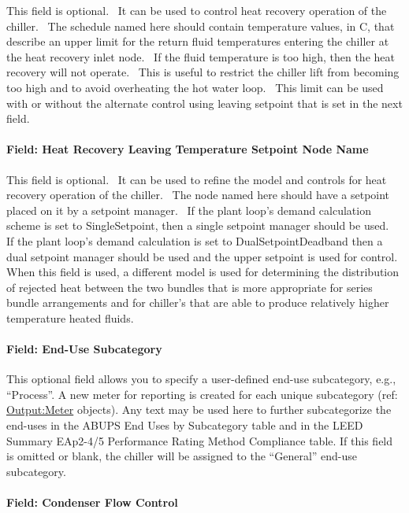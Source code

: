 This field is optional.~ It can be used to control heat recovery operation of the chiller.~ The schedule named here should contain temperature values, in C, that describe an upper limit for the return fluid temperatures entering the chiller at the heat recovery inlet node.~ If the fluid temperature is too high, then the heat recovery will not operate.~ This is useful to restrict the chiller lift from becoming too high and to avoid overheating the hot water loop.~ This limit can be used with or without the alternate control using leaving setpoint that is set in the next field.

\paragraph{Field: Heat Recovery Leaving Temperature Setpoint Node Name}\label{field-heat-recovery-leaving-temperature-setpoint-node-name-2}

This field is optional.~ It can be used to refine the model and controls for heat recovery operation of the chiller.~ The node named here should have a setpoint placed on it by a setpoint manager.~ If the plant loop's demand calculation scheme is set to SingleSetpoint, then a single setpoint manager should be used.~ If the plant loop's demand calculation is set to DualSetpointDeadband then a dual setpoint manager should be used and the upper setpoint is used for control.~ When this field is used, a different model is used for determining the distribution of rejected heat between the two bundles that is more appropriate for series bundle arrangements and for chiller's that are able to produce relatively higher temperature heated fluids.

\paragraph{Field: End-Use Subcategory}\label{end-use-subcategory-12}

This optional field allows you to specify a user-defined end-use subcategory, e.g., ``Process''. A new meter for reporting is created for each unique subcategory (ref: \hyperref[outputmeter-and-outputmetermeterfileonly]{Output:Meter} objects). Any text may be used here to further subcategorize the end-uses in the ABUPS End Uses by Subcategory table and in the LEED Summary EAp2-4/5 Performance Rating Method Compliance table. If this field is omitted or blank, the chiller will be assigned to the ``General'' end-use subcategory.

\paragraph{Field: Condenser Flow Control}\label{field-condenser-flow-control}

